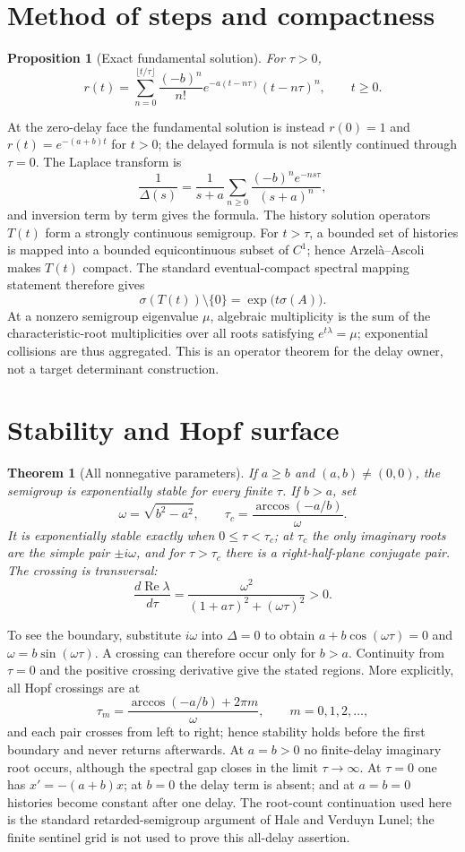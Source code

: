 \documentclass[11pt]{article}
\newtheorem{theorem}{Theorem}
\newtheorem{proposition}{Proposition}
\begin{document}
\section{Method of steps and compactness}
\begin{proposition}[Exact fundamental solution]
For $\tau>0$,
\[
 r(t)=\sum_{n=0}^{\lfloor t/\tau\rfloor}
 \frac{(-b)^n}{n!}e^{-a(t-n\tau)}(t-n\tau)^n,\qquad t\geq0.
\]
\end{proposition}
At the zero-delay face the fundamental solution is instead
$r(0)=1$ and $r(t)=e^{-(a+b)t}$ for $t>0$; the delayed formula is not
silently continued through $\tau=0$.
The Laplace transform is
\[
 \frac1{\Delta(s)}=\frac1{s+a}
 \sum_{n\geq0}\frac{(-b)^n e^{-ns\tau}}{(s+a)^n},
\]
and inversion term by term gives the formula.  The history solution operators
$T(t)$ form a strongly continuous semigroup.  For $t>\tau$, a bounded set of
histories is mapped into a bounded equicontinuous subset of $C^1$; hence
Arzelà--Ascoli makes $T(t)$ compact.  The standard eventual-compact spectral
 mapping statement therefore gives
 \[
  \sigma(T(t))\setminus\{0\}=\exp\!\bigl(t\sigma(A)\bigr).
 \]
 At a nonzero semigroup eigenvalue $\mu$, algebraic multiplicity is the sum of
 the characteristic-root multiplicities over all roots satisfying
 $e^{t\lambda}=\mu$; exponential collisions are thus aggregated.  This is an
 operator theorem for the delay owner, not a target determinant construction.

\section{Stability and Hopf surface}
\begin{theorem}[All nonnegative parameters]
If $a\geq b$ and $(a,b)\ne(0,0)$, the semigroup is exponentially stable for
every finite $\tau$.  If $b>a$, set
\[
 \omega=\sqrt{b^2-a^2},\qquad
 \tau_c=\frac{\arccos(-a/b)}{\omega}.
\]
It is exponentially stable exactly when $0\leq\tau<\tau_c$; at $\tau_c$ the
only imaginary roots are the simple pair $\pm i\omega$, and for $\tau>\tau_c$
there is a right-half-plane conjugate pair.  The crossing is transversal:
\[
 \frac{d\operatorname{Re}\lambda}{d\tau}
 =\frac{\omega^2}{(1+a\tau)^2+(\omega\tau)^2}>0.
\]
\end{theorem}
To see the boundary, substitute $i\omega$ into $\Delta=0$ to obtain
$a+b\cos(\omega\tau)=0$ and $\omega=b\sin(\omega\tau)$.  A crossing can
therefore occur only for $b>a$.  Continuity from $\tau=0$ and the positive
 crossing derivative give the stated regions.  More explicitly, all Hopf
 crossings are at
 \[
  \tau_m=\frac{\arccos(-a/b)+2\pi m}{\omega},\qquad m=0,1,2,\ldots,
 \]
 and each pair crosses from left to right; hence stability holds before the
 first boundary and never returns afterwards.  At $a=b>0$ no finite-delay
 imaginary root occurs, although the spectral gap closes in the limit
$\tau\to\infty$.  At $\tau=0$ one has $x'=-(a+b)x$; at $b=0$ the delay term
is absent; and at $a=b=0$ histories become constant after one delay.
The root-count continuation used here is the standard retarded-semigroup
argument of Hale and Verduyn Lunel; the finite sentinel grid is not used to
prove this all-delay assertion.
\end{document}
